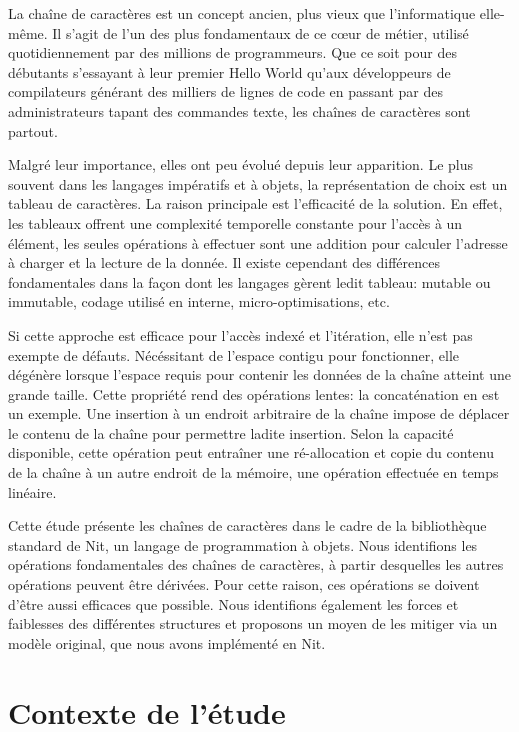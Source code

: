 \begin{introduction}

La chaîne de caractères est un concept ancien, plus vieux que l'informatique elle-même.
Il s'agit de l'un des plus fondamentaux
de ce c\oe{}ur de métier, utilisé quotidiennement par des
millions de programmeurs.
Que ce soit pour des débutants s'essayant à leur premier \og Hello World \fg{}
qu'aux développeurs de compilateurs générant des milliers de lignes de code
en passant par des administrateurs tapant des commandes texte,
les chaînes de caractères sont partout.

Malgré leur importance, elles ont peu évolué depuis leur apparition.
Le plus souvent dans les langages impératifs et à objets, la représentation de
choix est un tableau de caractères.
La raison principale est l'efficacité de la solution.
En effet, les tableaux offrent une complexité temporelle constante pour l'accès
à un élément, les seules opérations à effectuer sont une addition pour calculer l'adresse
à charger et la lecture de la donnée.
Il existe cependant des différences fondamentales dans la façon dont les langages gèrent ledit
tableau: mutable ou immutable, codage utilisé en interne, micro-optimisations, etc.

Si cette approche est efficace pour l'accès indexé et l'itération, elle n'est pas exempte de défauts.
Nécéssitant de l'espace contigu pour fonctionner, elle dégénère lorsque
l'espace requis pour contenir les données de la chaîne atteint une grande taille.
Cette propriété rend des opérations lentes: la concaténation en est un exemple.
Une insertion à un endroit arbitraire de la chaîne impose de déplacer le contenu de la chaîne
pour permettre ladite insertion.
Selon la capacité disponible, cette opération peut entraîner une ré-allocation et copie du
contenu de la chaîne à un autre endroit de la mémoire, une opération effectuée en temps
linéaire.

Cette étude présente les chaînes de caractères dans le cadre de la bibliothèque
standard de Nit, un langage de programmation à objets.
Nous identifions les opérations fondamentales des chaînes de caractères, à partir
desquelles les autres opérations peuvent être dérivées.
Pour cette raison, ces opérations se doivent d'être aussi efficaces que possible.
Nous identifions également les forces et faiblesses des différentes structures
et proposons un moyen de les mitiger via un modèle original, que nous
avons implémenté en Nit.

\section{Contexte de l'étude}


\end{introduction}
